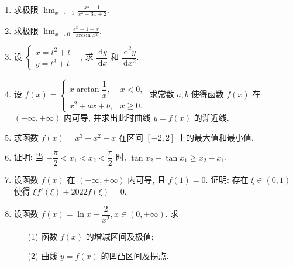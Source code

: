\documentclass{hfutexam}
\newcommand{\diff}{\,\mathrm{d}}
\begin{document}
\begin{enumerate}
\item 求极限 $\displaystyle\lim_{x\to-1}\frac{x^2-1}{x^2+3x+2}$.
\item 求极限 $\displaystyle\lim_{x\to0}\frac{e^x-1-x}{\arcsin x^2}$.
\item 设 $\begin{cases}x=t^2+t&\\y=t^3+t&\end{cases}$, 求 $\dfrac{\diff y}{\diff x}$ 和 $\dfrac{\diff^2 y}{\diff x^2}$.
\item 设 $f(x)=\begin{cases}x\arctan\dfrac1x,&x<0,\\x^2+ax+b,&x\ge0.\end{cases}$
求常数 $a,b$ 使得函数 $f(x)$ 在 $(-\infty,+\infty)$ 内可导, 并求出此时曲线 $y=f(x)$ 的渐近线.
\item	求函数 $f(x)=x^3-x^2-x$ 在区间 $[-2,2]$ 上的最大值和最小值.
\item 证明: 当 $-\dfrac\pi2<x_1<x_2<\dfrac\pi2$ 时, $\tan x_2-\tan x_1\ge x_2-x_1$.
\item 设函数 $f(x)$ 在 $(-\infty,+\infty)$ 内可导, 且 $f(1)=0$.
证明: 存在 $\xi\in(0,1)$ 使得 $\xi f'(\xi)+2022f(\xi)=0$.
\item 设函数 $f(x)=\ln x+\dfrac2{x^2}, x\in(0,+\infty)$. 求
\begin{enumerate}
\item[(1)] 函数 $f(x)$ 的增减区间及极值;
\item[(2)] 曲线 $y=f(x)$ 的凹凸区间及拐点.
\end{enumerate}
\end{enumerate}
\end{document}
